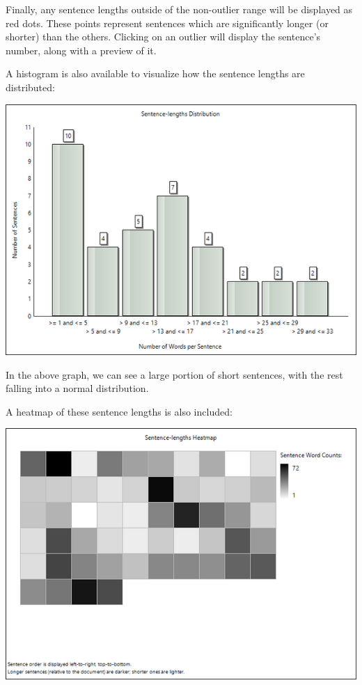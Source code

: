 \documentclass[
]{book}
\theoremstyle{definition}
\theoremstyle{definition}
\theoremstyle{definition}
\theoremstyle{definition}
\theoremstyle{remark}
\begin{document}
Finally, any sentence lengths outside of the non-outlier range will be displayed as red dots. These points represent sentences which are significantly longer (or shorter) than the others. Clicking on an outlier will display the sentence's number, along with a preview of it.

A histogram is also available to visualize how the sentence lengths are distributed:

\includegraphics{Images/SentencesHistogram.png}

In the above graph, we can see a large portion of short sentences, with the rest falling into a normal distribution.

A heatmap of these sentence lengths is also included:

\includegraphics{Images/SentencesHeatmap.png}
\end{document}
